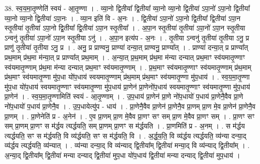 \documentclass[17pt]{extarticle}
\begin{document}
38. स्व॒य॒मा॒तृ॒ण्णेति॑ स्वयं - आ॒तृ॒ण्णा । . व्या॒नो द्वि॒तीया᳚ द्वि॒तीया᳚ व्या॒नो व्या॒नो द्वि॒तीया॑ ऽपा॒नो॑ ऽपा॒नो द्वि॒तीया᳚ व्या॒नो व्या॒नो द्वि॒तीया॑ ऽपा॒नः । . व्या॒न इति॑ वि - अ॒नः । . द्वि॒तीया॑ ऽपा॒नो॑ ऽपा॒नो द्वि॒तीया᳚ द्वि॒तीया॑ ऽपा॒न स्तृ॒तीया॑ तृ॒तीया॑ ऽपा॒नो द्वि॒तीया᳚ द्वि॒तीया॑ ऽपा॒न स्तृ॒तीया᳚ । . अ॒पा॒न स्तृ॒तीया॑ तृ॒तीया॑ ऽपा॒नो॑ ऽपा॒न स्तृ॒तीया ऽन्वनु॑ तृ॒तीया॑ ऽपा॒नो॑ ऽपा॒न स्तृ॒तीया ऽनु॑ । . अ॒पा॒न इत्य॑प - अ॒नः । . तृ॒तीया ऽन्वनु॑ तृ॒तीया॑ तृ॒तीया ऽनु॒ प्र प्राणु॑ तृ॒तीया॑ तृ॒तीया ऽनु॒ प्र । . अनु॒ प्र प्राण्वनु॒ प्राण्या॑ दन्या॒त् प्राण्वनु॒ प्राण्या᳚त् । . प्राण्या॑ दन्या॒त् प्र प्राण्या᳚त् प्रथ॒माम् प्र॑थ॒मा म॑न्या॒त् प्र प्राण्या᳚त् प्रथ॒माम् । . अ॒न्या॒त् प्र॒थ॒माम् प्र॑थ॒मा म॑न्या दन्यात् प्रथ॒माꣳ स्व॑यमातृ॒ण्णाꣳ स्व॑यमातृ॒ण्णाम् प्र॑थ॒मा म॑न्या दन्यात् प्रथ॒माꣳ स्व॑यमातृ॒ण्णाम् । . प्र॒थ॒माꣳ स्व॑यमातृ॒ण्णाꣳ स्व॑यमातृ॒ण्णाम् प्र॑थ॒माम् प्र॑थ॒माꣳ स्व॑यमातृ॒ण्णा मु॑प॒धा यो॑प॒धाय॑ स्वयमातृ॒ण्णाम् प्र॑थ॒माम् प्र॑थ॒माꣳ स्व॑यमातृ॒ण्णा मु॑प॒धाय॑ । . स्व॒य॒मा॒तृ॒ण्णा मु॑प॒धा यो॑प॒धाय॑ स्वयमातृ॒ण्णाꣳ स्व॑यमातृ॒ण्णा मु॑प॒धाय॑ प्रा॒णेन॑ प्रा॒णेनो॑प॒धाय॑ स्वयमातृ॒ण्णाꣳ स्व॑यमातृ॒ण्णा मु॑प॒धाय॑ प्रा॒णेन॑ । . स्व॒य॒मा॒तृ॒ण्णामिति॑ स्वयं - आ॒तृ॒ण्णाम् । . उ॒प॒धाय॑ प्रा॒णेन॑ प्रा॒णे नो॑प॒धायो॑ प॒धाय॑ प्रा॒णेनै॒वैव प्रा॒णे नो॑प॒धायो॑ प॒धाय॑ प्रा॒णेनै॒व । . उ॒प॒धायेत्यु॑प - धाय॑ । . प्रा॒णेनै॒वैव प्रा॒णेन॑ प्रा॒णेनै॒व प्रा॒णम् प्रा॒ण मे॒व प्रा॒णेन॑ प्रा॒णेनै॒व प्रा॒णम् । . प्रा॒णेनेति॑ प्र - अ॒नेन॑ । . ए॒व प्रा॒णम् प्रा॒ण मे॒वैव प्रा॒णꣳ सꣳ सम् प्रा॒ण मे॒वैव प्रा॒णꣳ सम् । . प्रा॒णꣳ सꣳ सम् प्रा॒णम् प्रा॒णꣳ स म॑र्द्धय त्यर्द्धयति॒ सम् प्रा॒णम् प्रा॒णꣳ स म॑र्द्धयति । . प्रा॒णमिति॑ प्र - अ॒नम् । . स म॑र्द्धय त्यर्द्धयति॒ सꣳ स म॑र्द्धयति॒ वि व्य॑र्द्धयति॒ सꣳ स म॑र्द्धयति॒ वि । . अ॒र्द्ध॒य॒ति॒ वि व्य॑र्द्धय त्यर्द्धयति॒ व्य॑न्या दन्या॒द् व्य॑र्द्धय त्यर्द्धयति॒ व्य॑न्यात् । . व्य॑न्या दन्या॒द् वि व्य॑न्याद् द्वि॒तीया᳚म् द्वि॒तीया॑ मन्या॒द् वि व्य॑न्याद् द्वि॒तीया᳚म् । . अ॒न्या॒द् द्वि॒तीया᳚म् द्वि॒तीया॑ मन्या दन्याद् द्वि॒तीया॑ मुप॒धा यो॑प॒धाय॑ द्वि॒तीया॑ मन्या दन्याद् द्वि॒तीया॑ मुप॒धाय॑ । \newline
\pagebreak
{}
\end{document}
